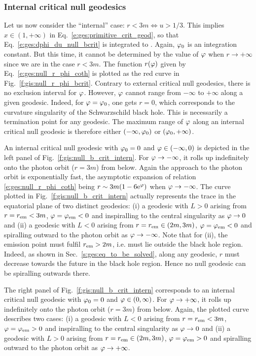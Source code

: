 \subsubsection{Internal critical null geodesics}

Let us now consider the ``internal'' case: $r< 3m \iff u>1/3$.
This implies $x\in (1,+\infty)$ in Eq.~\eqref{e:ges:primitive_crit_geod},
so that Eq.~\eqref{e:ges:dphi_du_null_bcrit} is integrated to
\be \label{e:ges:null_r_phi_coth}
    .
\ee
Again, $\varphi_0$ is an integration constant. But this time, it cannot be determined by the
value of $\varphi$ when $r\to +\infty$ since we are in the case $r<3m$.
The function $r(\varphi)$ given by Eq.~\eqref{e:ges:null_r_phi_coth} is plotted as the red
curve in Fig.~\ref{f:gis:null_r_phi_bcrit}. Contrary to external critical null geodesics, there
is no exclusion interval for $\varphi$. However, $\varphi$ cannot range from $-\infty$
to $+\infty$ along a given geodesic. Indeed, for $\varphi=\varphi_0$, one gets
$r=0$, which corresponds to the curvature singularity of the Schwarzschild black hole.
This is necessarily a termination point for any geodesic. The maximum
range of $\varphi$ along an internal critical null geodesic is therefore
either $(-\infty,\varphi_0)$ or $(\varphi_0,+\infty)$.

An internal critical null geodesic with $\varphi_0=0$ and $\varphi\in(-\infty,0)$
is depicted in the left panel of Fig.~\ref{f:gis:null_b_crit_intern}.
For $\varphi\to -\infty$, it rolls up indefinitely onto the photon
orbit ($r=3m$) from below. Again the approach to the photon orbit is exponentially
fast, the asymptotic expansion of relation \eqref{e:ges:null_r_phi_coth} being
$r\sim 3m (1 - 6 \mathrm{e}^\varphi)$ when $\varphi\to -\infty$.
The curve plotted in Fig.~\ref{f:gis:null_b_crit_intern} actually represents the trace in the equatorial plane of two
distinct geodesics: (i) a geodesic with $L>0$ arising
from $r=r_{\rm em} < 3 m$, $\varphi=\varphi_{\rm em}<0$ and inspiralling to the
central singularity as $\varphi\to 0$ and (ii) a geodesic with $L<0$ arising from
$r = r_{\rm em} \in (2m,  3 m)$, $\varphi=\varphi_{\rm em}<0$ and spiralling outward
to the photon orbit as $\varphi\to -\infty$. Note that for (ii), the
emission point must fulfil $r_{\rm em} > 2m$, i.e. must lie outside the black
hole region. Indeed, as shown in Sec.~\ref{s:ges:eq_to_be_solved}, along
any geodesic, $r$ must decrease towards the future in the black hole region.
Hence no null geodesic can be spiralling outwards there.

The right panel of Fig.~\ref{f:gis:null_b_crit_intern} corresponds to an
internal critical null geodesic with $\varphi_0=0$ and $\varphi\in(0, \infty)$.
For $\varphi\to +\infty$, it rolls up indefinitely onto the photon
orbit ($r=3m$) from below. Again, the plotted curve describes two cases:
(i) a geodesic with $L<0$ arising
from $r=r_{\rm em} < 3 m$, $\varphi=\varphi_{\rm em}>0$ and inspiralling to the
central singularity as $\varphi\to 0$ and (ii) a geodesic with $L>0$ arising from
$r = r_{\rm em} \in (2m,  3 m)$, $\varphi=\varphi_{\rm em}>0$ and spiralling outward
to the photon orbit as $\varphi\to +\infty$.


